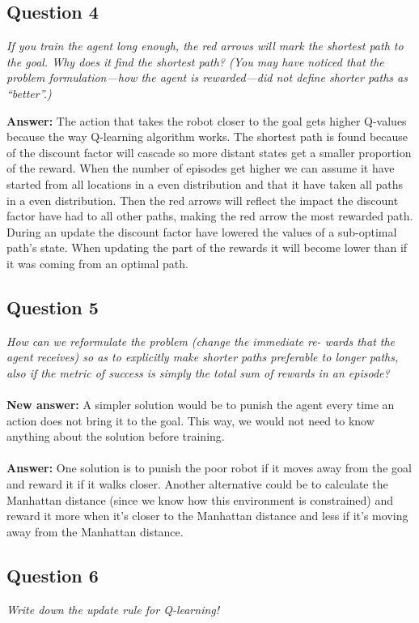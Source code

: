\documentclass[a4paper]{article}
\begin{document}
\subsection*{Question 4}
\emph{If you train the agent long enough, the red arrows will mark the
shortest path to the goal. Why does it find the shortest path? (You may have noticed that the problem formulation—how the agent is rewarded—did not define shorter paths as ``better''.)}

\textbf{Answer:} The action that takes the robot closer to the goal gets higher Q-values because the way Q-learning algorithm works. The shortest path is found because of the discount factor will cascade so more distant states get a smaller proportion of the reward. When the number of episodes get higher we can assume it have started from all locations in a even distribution and that it have taken all paths in a even distribution. Then the red arrows will reflect the impact the discount factor have had to all other paths, making the red arrow the most rewarded path.
During an update the discount factor have lowered the values of a sub-optimal path's state. When updating the part of the rewards it will become lower than if it was coming from an optimal path. 

\subsection*{Question 5}
\emph{How can we reformulate the problem (change the immediate re-
wards that the agent receives) so as to explicitly make shorter paths preferable
to longer paths, also if the metric of success is simply the total sum of 
rewards in an episode?}
\\\\
\textbf{New answer:} A simpler solution would be to punish the agent every
time an action does not bring it to the goal. This way, we would not need to
know anything about the solution before training. 
\\\\
\textbf{Answer:} One solution is to punish the poor robot if it moves away from 
the goal and reward it if it walks closer. 
Another alternative could be to calculate the Manhattan distance (since we know 
how this environment is constrained) and reward it more when it's closer to the 
Manhattan distance and less if it's moving away from the Manhattan distance.

\subsection*{Question 6}
\emph{Write down the update rule for Q-learning!}
\end{document}
